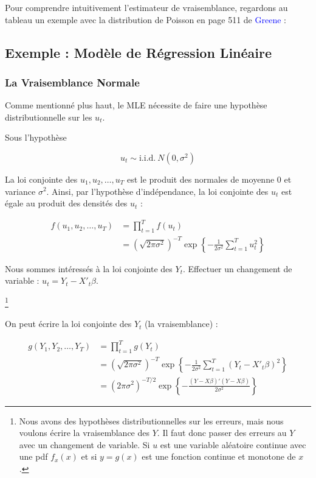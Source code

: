 \documentclass[14pt]{extarticle} %
\newcommand{\livre}[1]{\textcolor{blue}{#1}}
\begin{document}
Pour comprendre intuitivement l’estimateur de vraisemblance, regardons au tableau un exemple avec la distribution de Poisson en page 511 de \livre{Greene} :

\subsection{Exemple : Modèle de Régression Linéaire}

\subsubsection{La Vraisemblance Normale}

Comme mentionné plus haut, le MLE nécessite de faire une hypothèse distributionnelle sur les \(u_t\).

Sous l’hypothèse

\begin{equation*}
u_t \sim \text{i.i.d.} \ N(0 , \sigma^2)
\end{equation*}

La loi conjointe des \(u_1, u_2, \ldots, u_T\) est le produit des normales de moyenne 0 et variance \(\sigma^2\). Ainsi, par l’hypothèse d’indépendance, la loi conjointe des \(u_t\) est égale au produit des densités des \(u_t\) :

\begin{align*}
f(u_1, u_2, \ldots , u_T ) &= \prod_{t=1}^{T} f(u_t) \\
&= \left(\sqrt{2\pi\sigma^2}\right)^{-T} \exp\left\{-\frac{1}{2\sigma^2} \sum_{t=1}^{T} u_t^2 \right\}
\end{align*}

Nous sommes intéressés à la loi conjointe des \(Y_t\). Effectuer un changement de variable : \(u_t = Y_t - X'_t \beta\).

\footnote{Nous avons des hypothèses distributionnelles sur les erreurs, mais nous voulons écrire la vraisemblance des \(Y\). Il faut donc passer des erreurs au \(Y\) avec un changement de variable. Si \(u\) est une variable aléatoire continue avec une pdf \(f_x (x)\) et si \(y = g(x)\) est une fonction continue et monotone de \(x\).}

On peut écrire la loi conjointe des \(Y_t\) (la vraisemblance) :

\begin{align*}
g(Y_1, Y_2, \ldots , Y_T) &= \prod_{t=1}^{T} g(Y_t) \\
&= \left(\sqrt{2\pi\sigma^2}\right)^{-T} \exp\left\{-\frac{1}{2\sigma^2} \sum_{t=1}^{T} (Y_t - X'_t \beta)^2 \right\} \\
&= (2\pi\sigma^2)^{-T/2} \exp \left\{ -\frac{(Y - X\beta)'(Y - X\beta)}{2\sigma^2} \right\}
\end{align*}
\end{document}
